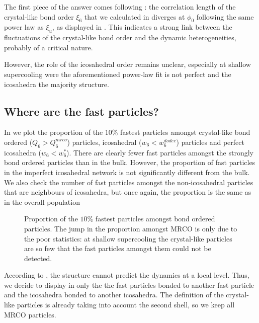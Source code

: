 The first piece of the answer comes following \citet{tanaka2010critical}: the correlation length of the crystal-like bond order $\xi_6$ that we calculated in  diverges at $\phi_0$ following the same power law as $\xi_u$, as displayed in . This indicates a strong link between the fluctuations of the crystal-like bond order and the dynamic heterogeneities, probably of a critical nature.

However, the role of the icosahedral order remains unclear, especially at shallow supercooling were the aforementioned power-law fit is not perfect and the icosahedra the majority structure.

\subsection{Where are the fast particles?}

In  we plot the proportion of the $10\%$ fastest particles amongst crystal-like bond ordered ($Q_6>Q_6^{mrco}$) particles, icosahedral ($w_6<w_6^{dodec}$) particles and perfect icosahedra ($w_6<w_6^*$). There are clearly fewer fast particles amongst the strongly bond ordered particles than in the bulk. However, the proportion of fast particles in the imperfect icosahedral network is not significantly different from the bulk. We also check the number of fast particles amongst the non-icosahedral particles that are neighbours of icosahedra, but once again, the proportion is the same as in the overall population

\begin{figure}
	\centering
	\resizebox{0.8\textwidth}{!}{}
	\caption{Proportion of the $10\%$ fastest particles amongst bond ordered particles. The jump in the proportion amongst \acs{MRCO} is only due to the poor statistics: at shallow supercooling the crystal-like particles are so few that the fast particles amongst them could not be detected.}
	\label{fig:proportions_phi}
\end{figure}

According to \citet{Berthier2007}, the structure cannot predict the dynamics at a local level. Thus, we decide to display in  only the the fast particles bonded to another fast particle and the icosahedra bonded to another icosahedra. The definition of the crystal-like particles is already taking into account the second shell, so we keep all \ac{MRCO} particles.

